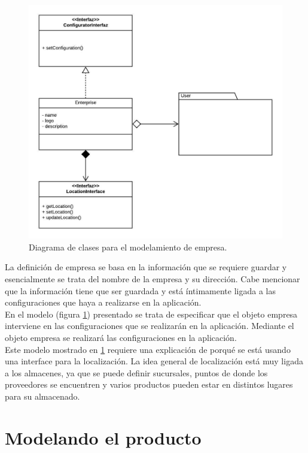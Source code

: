 \begin{figure}
  \centering
    \includegraphics[scale=0.9]{./Capitulo3/figs/ADDStock-enterprise.jpeg}
  \caption{Diagrama de clases para el modelamiento de empresa.}
  \label{enterprise}
\end{figure}

La definición de empresa se basa en la información que se requiere guardar y esencialmente se trata del nombre de la empresa y su dirección. Cabe mencionar que la información tiene que ser guardada y está íntimamente ligada a las configuraciones que haya a realizarse en la aplicación.\\

En el modelo (figura \ref{enterprise}) presentado se trata de especificar que el objeto empresa interviene en las configuraciones que se realizarán en la aplicación. Mediante el objeto empresa se realizará las configuraciones en la aplicación.\\

Este modelo mostrado en \ref{enterprise} requiere una explicación de porqué se está usando una interface para la localización. La idea general de localización está muy ligada a los almacenes, ya que se puede definir sucursales, puntos de donde los proveedores se encuentren y varios productos pueden estar en distintos lugares para su almacenado.

\section{Modelando el producto}

